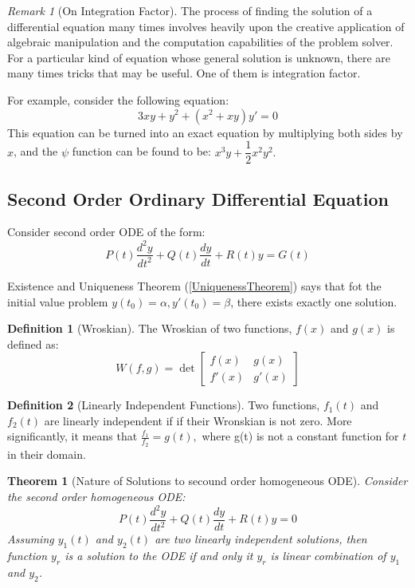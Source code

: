 \documentclass[12pt,a4paper]{article}
\newtheorem{theorem}{Theorem}[subsection]
\theoremstyle{definition}
\newtheorem{definition}{Definition}[section]
\theoremstyle{remark}
\newtheorem{remark}{Remark}[section]
\begin{document}
\begin{remark}[On Integration Factor]
The process of finding the solution of a differential equation many times involves heavily upon the creative application of algebraic manipulation
and the computation capabilities of the problem solver. For a particular kind of equation whose general solution is unknown, there are many times
tricks that may be useful. One of them is integration factor.

For example, consider the following equation:
\[
	3xy+y^2 +(x^2+xy)y' = 0
\]
This equation can be turned into an exact equation by multiplying both sides by $x$, and the $\psi$ function can be found to be: $x^3y+ \dfrac{1}{2}x^2y^2.$
\end{remark}

\subsection{Second Order Ordinary Differential Equation}
Consider second order ODE of the form:
\[
	P(t) \frac{d^2y}{dt^2} + Q(t) \frac{dy}{dt} + R(t) y = G(t)
\]

Existence and Uniqueness Theorem (\ref{UniquenessTheorem}) says that fot the initial value problem $y(t_0)=\alpha, y'(t_0) = \beta$, there exists exactly one solution.

\begin{definition}[Wroskian]
	The Wroskian of two functions, $f(x)$ and $g(x)$ is defined as:\[
		W(f,g) = \det \begin{bmatrix} f(x) & g(x) \\ f'(x) & g'(x) \end{bmatrix}
	\]
\end{definition}

\begin{definition}[Linearly Independent Functions]
	Two functions, $f_1(t)$ and $f_2(t)$ are linearly independent if if their Wronskian is not zero.
More significantly, it means that $ \frac{f_1}{f_2} = g(t),$ where g(t) is not a constant function for $t$ in their domain.
\end{definition}

\begin{theorem}[Nature of Solutions to secound order homogeneous ODE]
	Consider the second order homogeneous ODE:
\[
	P(t) \frac{d^2y}{dt^2} + Q(t) \frac{dy}{dt} + R(t) y = 0
\]
Assuming $y_1(t)$ and $y_2(t)$ are two linearly independent solutions, then function $y_r$ is a solution to the ODE if and only it $y_r$ is linear combination of $y_1$ and $y_2$.

\end{theorem}
\end{document}

